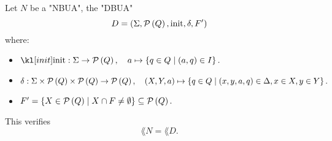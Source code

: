 \documentclass{article}
\begin{document}
\begin{theorem}
	Let $N$ be a "NBUA", the "DBUA"
	\[
		D = (\Sigma, \mathcal{P}\left(Q\right), \text{init}, \delta, F' )
	\]
	where:

	\begin{itemize}
		\setlength{\itemsep}{0pt} %
		\item $ \init : \Sigma \to \parts Q, \quad a \mapsto \setdef{q \in Q}{(a,q) \in I}. $
		\item $ \delta : \Sigma \times \mathcal{P}\left(Q\right) \times \mathcal{P}\left(Q\right) \to \mathcal{P}\left(Q\right), \quad (X, Y, a) \mapsto \left\{q \in Q \mid (x,y,a,q) \in \Delta, x \in X, y \in Y\right\}. $
		\item $ F' = \left\{X \in \mathcal{P}\left(Q\right) \mid X \cap F \neq \emptyset\right\} \subseteq \mathcal{P}\left(Q\right). $
	\end{itemize}

	This verifies
	\[
		\lang N = \lang D.
	\]
\end{theorem}
\end{document}

